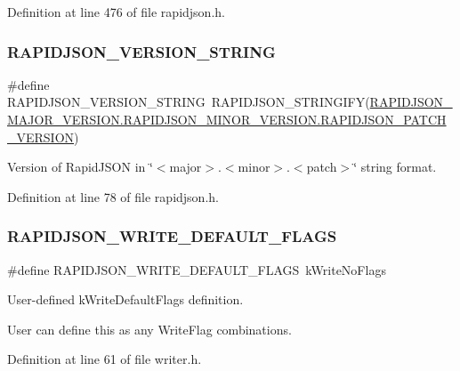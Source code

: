 Definition at line 476 of file rapidjson.\+h.

\mbox{\label{group___r_a_p_i_d_j_s_o_n___c_o_n_f_i_g_gad283cfde97d9a32b7d8e8107b11f70a6}} 
\subsubsection{\texorpdfstring{RAPIDJSON\_VERSION\_STRING}{RAPIDJSON\_VERSION\_STRING}}
{\footnotesize\ttfamily \#define R\+A\+P\+I\+D\+J\+S\+O\+N\+\_\+\+V\+E\+R\+S\+I\+O\+N\+\_\+\+S\+T\+R\+I\+NG~R\+A\+P\+I\+D\+J\+S\+O\+N\+\_\+\+S\+T\+R\+I\+N\+G\+I\+FY(\mbox{\hyperlink{group___r_a_p_i_d_j_s_o_n___c_o_n_f_i_g_gaf967d31be43666ce7f53756d73bd1cdf}{R\+A\+P\+I\+D\+J\+S\+O\+N\+\_\+\+M\+A\+J\+O\+R\+\_\+\+V\+E\+R\+S\+I\+O\+N.\+R\+A\+P\+I\+D\+J\+S\+O\+N\+\_\+\+M\+I\+N\+O\+R\+\_\+\+V\+E\+R\+S\+I\+O\+N.\+R\+A\+P\+I\+D\+J\+S\+O\+N\+\_\+\+P\+A\+T\+C\+H\+\_\+\+V\+E\+R\+S\+I\+ON}})}



Version of Rapid\+J\+S\+ON in \char`\"{}$<$major$>$.$<$minor$>$.$<$patch$>$\char`\"{} string format. 



Definition at line 78 of file rapidjson.\+h.

\mbox{\label{group___r_a_p_i_d_j_s_o_n___c_o_n_f_i_g_ga1975595e2f1dc20a2d4859f340ac88c6}} 
\subsubsection{\texorpdfstring{RAPIDJSON\_WRITE\_DEFAULT\_FLAGS}{RAPIDJSON\_WRITE\_DEFAULT\_FLAGS}}
{\footnotesize\ttfamily \#define R\+A\+P\+I\+D\+J\+S\+O\+N\+\_\+\+W\+R\+I\+T\+E\+\_\+\+D\+E\+F\+A\+U\+L\+T\+\_\+\+F\+L\+A\+GS~k\+Write\+No\+Flags}



User-\/defined k\+Write\+Default\+Flags definition. 

User can define this as any {\ttfamily Write\+Flag} combinations. 

Definition at line 61 of file writer.\+h.

